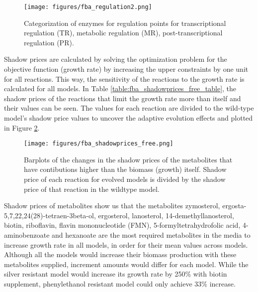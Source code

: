 \begin{figure}[H]
  \begin{center}
  \texttt{[image: figures/fba\_regulation2.png]}
  \caption[Categorization of enzymes for regulation points for transcriptional regulation (TR), metabolic regulation (MR), post-transcriptional regulation (PR)]{Categorization of enzymes for regulation points for transcriptional regulation (TR), metabolic regulation (MR), post-transcriptional regulation (PR).}
  \label{fig:fba_regulation}
  \end{center}
\end{figure}

Shadow prices are calculated by solving the optimization problem for the objective function (growth rate) by increasing the upper constraints by one unit for all reactions. This way, the sensitivity of the reactions to the growth rate is calculated for all models. In Table \ref{table:fba_shadowprices_free_table}, the shadow prices of the reactions that limit the growth rate more than itself and their values can be seen. The values for each reaction are divided to the wild-type model's shadow price values to uncover the adaptive evolution effects and plotted in Figure \ref{fig:fba_shadowprices_free}.

\baselineskip


\begin{figure}[H]
  \begin{center}
  \texttt{[image: figures/fba\_shadowprices\_free.png]}
  \caption[Barplots of the changes in the shadow prices of the metabolites that have contibutions higher than the biomass (growth) itself. Shadow price of each reaction for evolved models is divided by the shadow price of that reaction in the wildtype model]{Barplots of the changes in the shadow prices of the metabolites that have contibutions higher than the biomass (growth) itself. Shadow price of each reaction for evolved models is divided by the shadow price of that reaction in the wildtype model.}
  \label{fig:fba_shadowprices_free}
  \end{center}
\end{figure}

Shadow prices of metabolites show us that the metabolites zymosterol, ergosta-5,7,22,24(28)-tetraen-3beta-ol, ergosterol, lanosterol, 14-demethyllanosterol, biotin, riboflavin, flavin mononucleotide (FMN), 5-formyltetrahydrofolic acid, 4-aminobenzoate and hexanoate are the most required metabolites in the media to increase growth rate in all models, in order for their mean values across models. Although all the models would increase their biomass production with these metabolites supplied, increment amounts would differ for each model. While the silver resistant model would increase its growth rate by 250\% with biotin supplement, phenylethanol resistant model could only achieve 33\% increase.

